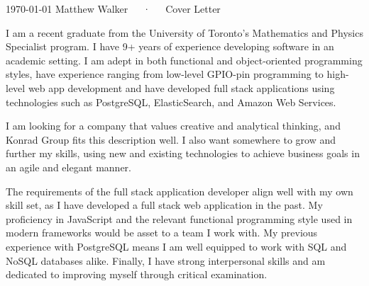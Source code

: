 \documentclass[11pt, a4paper]{awesome-cv}
\begin{document}
\makecvheader[R]

\makecvfooter
  {\today}
  {Matthew Walker~~~·~~~Cover Letter}
  {}

\makelettertitle

\begin{cvletter}


  I am a recent graduate from the University of Toronto's Mathematics and
  Physics Specialist program. I have 9+ years of experience developing software
  in an academic setting. I am adept in both functional and object-oriented
  programming styles, have experience ranging from low-level GPIO-pin
  programming to high-level web app development and have developed full stack
  applications using technologies such as PostgreSQL, ElasticSearch, and Amazon
  Web Services.


  I am looking for a company that values creative and analytical thinking, and
  Konrad Group fits this description well. I also want somewhere to grow and
  further my skills, using new and existing technologies to achieve business
  goals in an agile and elegant manner.

  
  The requirements of the full stack application developer align well with my
  own skill set, as I have developed a full stack web application in the past.
  My proficiency in JavaScript and the relevant functional programming style
  used in modern frameworks would be asset to a team I work with. My previous
  experience with PostgreSQL means I am well equipped to work with SQL and NoSQL
  databases alike. Finally, I have strong interpersonal skills and am dedicated
  to improving myself through critical examination.
  
\end{cvletter}


\makeletterclosing
\end{document}
